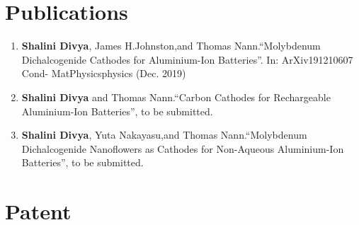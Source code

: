 \section*{\centering Publications}
\begin{enumerate}
    \item \textbf{Shalini Divya}, James H.Johnston,and Thomas Nann.“Molybdenum Dichalcogenide Cathodes for Aluminium-Ion Batteries”. In: ArXiv191210607 Cond- MatPhysicsphysics (Dec. 2019) %
    \item \textbf{Shalini Divya} and Thomas Nann.“Carbon Cathodes for Rechargeable Aluminium-Ion Batteries”, to be submitted.
    \item \textbf{Shalini Divya}, Yuta Nakayasu,and Thomas Nann.“Molybdenum Dichalcogenide Nanoflowers as Cathodes for Non-Aqueous Aluminium-Ion Batteries”, to be submitted.
\end{enumerate}
\section*{\centering Patent}
